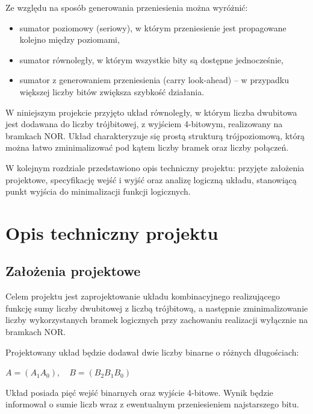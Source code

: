 \documentclass[11pt]{article}
\begin{document}
Ze względu na sposób generowania przeniesienia można wyróżnić:
\begin{itemize}
    \item sumator poziomowy (seriowy), w którym przeniesienie jest propagowane kolejno między poziomami,
    \item sumator równoległy, w którym wszystkie bity są dostępne jednocześnie,
    \item sumator z generowaniem przeniesienia (carry look-ahead) -- w przypadku większej liczby bitów zwiększa szybkość działania.
\end{itemize}

W niniejszym projekcie przyjęto układ równoległy, w którym liczba dwubitowa jest dodawana do liczby trójbitowej, z wyjściem 4-bitowym, realizowany na bramkach NOR. Układ charakteryzuje się prostą strukturą trójpoziomową, którą można łatwo zminimalizować pod kątem liczby bramek oraz liczby połączeń.

W kolejnym rozdziale przedstawiono opis techniczny projektu: przyjęte założenia projektowe, specyfikację wejść i wyjść oraz analizę logiczną układu, stanowiącą punkt wyjścia do minimalizacji funkcji logicznych.

\section{Opis techniczny projektu}

\subsection{Założenia projektowe}

Celem projektu jest zaprojektowanie układu kombinacyjnego realizującego funkcję sumy liczby dwubitowej z liczbą trójbitową, a następnie zminimalizowanie liczby wykorzystanych bramek logicznych przy zachowaniu realizacji wyłącznie na bramkach NOR.

Projektowany układ będzie dodawał dwie liczby binarne o różnych długościach:
\begin{center}
$A = (A_1 A_0),\quad B = (B_2 B_1 B_0)$
\end{center}
Układ posiada pięć wejść binarnych oraz wyjście 4-bitowe. Wynik będzie informował o sumie liczb wraz z ewentualnym przeniesieniem najstarszego bitu.
\end{document}

